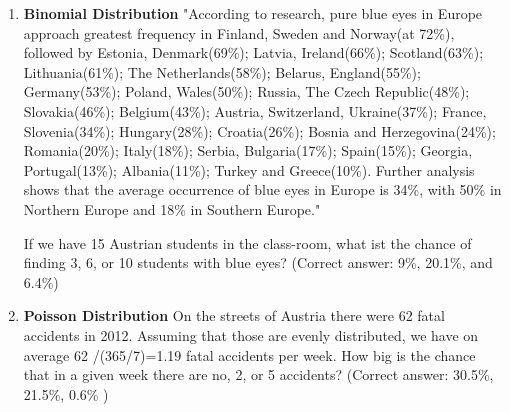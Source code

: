 \begin{enumerate}
    \item \textbf{Binomial Distribution} "According to research, pure blue eyes in Europe approach greatest frequency in Finland, Sweden and Norway(at 72\%), followed by Estonia, Denmark(69\%); Latvia, Ireland(66\%); Scotland(63\%); Lithuania(61\%); The Netherlands(58\%); Belarus, England(55\%); Germany(53\%); Poland, Wales(50\%); Russia, The Czech Republic(48\%); Slovakia(46\%); Belgium(43\%); Austria, Switzerland, Ukraine(37\%); France, Slovenia(34\%); Hungary(28\%); Croatia(26\%); Bosnia and Herzegovina(24\%); Romania(20\%); Italy(18\%); Serbia, Bulgaria(17\%); Spain(15\%); Georgia, Portugal(13\%); Albania(11\%); Turkey and Greece(10\%). Further analysis shows that the average occurrence of blue eyes in Europe is 34\%, with 50\% in Northern Europe and 18\% in Southern Europe."

    If we have 15 Austrian students in the class-room, what ist the chance of finding 3, 6, or 10 students with blue eyes?
    (Correct answer: 9\%, 20.1\%, and 6.4\%)

    \item \textbf{Poisson Distribution} On the streets of Austria there were 62 fatal accidents in 2012. Assuming that those are evenly distributed, we have on average
    62 /(365/7)=1.19 fatal accidents per week. How big is the chance that in a given week there are no, 2, or 5 accidents?
    (Correct answer: 30.5\%, 21.5\%, 0.6\% )
\end{enumerate}
